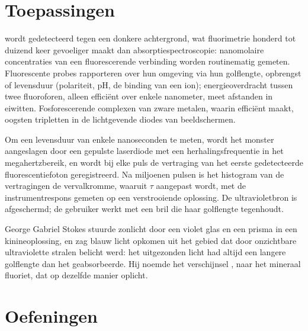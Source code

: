 \section{Toepassingen}

 wordt gedetecteerd tegen een donkere achtergrond, wat
fluorimetrie honderd tot duizend keer gevoeliger maakt dan
absorptiespectroscopie: nanomolaire concentraties van een fluorescerende
verbinding worden routinematig gemeten. Fluorescente probes rapporteren
over hun omgeving via hun golflengte, opbrengst of levensduur (polariteit,
pH, de binding van een ion); energieoverdracht tussen twee fluoroforen,
alleen efficiënt over enkele nanometer, meet afstanden in eiwitten.
Fosforescerende complexen van zware metalen, waarin 
 efficiënt maakt, oogsten tripletten in de
lichtgevende diodes van beeldschermen.

\begin{inthelab}
Om een levensduur van enkele nanoseconden te meten, wordt het monster
aangeslagen door een gepulste laserdiode met een herhalingsfrequentie in
het megahertzbereik, en wordt bij elke puls de vertraging van het eerste
gedetecteerde fluorescentiefoton geregistreerd. Na miljoenen pulsen is het
histogram van de vertragingen de vervalkromme, waaruit $\tau$ aangepast
wordt, met de instrumentrespons gemeten op een verstrooiende oplossing.
De ultravioletbron is afgeschermd; de gebruiker werkt met een bril die
haar golflengte tegenhoudt.
\end{inthelab}

\begin{history}[Stokes, 1852]
George Gabriel Stokes stuurde zonlicht door een violet glas en een prisma
in een kinineoplossing, en zag blauw licht opkomen uit het gebied dat door
onzichtbare ultraviolette stralen belicht werd: het uitgezonden licht had
altijd een langere golflengte dan het geabsorbeerde. Hij noemde het
verschijnsel , naar het mineraal fluoriet, dat op dezelfde
manier oplicht.
\end{history}

\section{Oefeningen}

